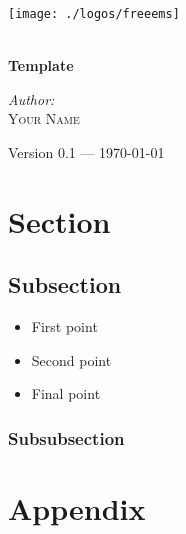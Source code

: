 \documentclass[12pt,a4paper,titlepage]{article}
\begin{document}
\begin{titlepage} 
\begin{center}

\texttt{[image: ./logos/freeems]}\\[1cm] \vfill

\HRule \\[0.8cm]
{ \huge \bfseries Template}\\[0.4cm]
\HRule \vfill

\Large \emph{Author:}\\
\textsc{Your Name} \vfill

{\large Version 0.1 --- \today}

\end{center}
\end{titlepage} 


\section{Section }

\subsection{Subsection }

\begin{itemize}
\item First point
\item Second point
\item Final point
\end{itemize}

\subsubsection{Subsubsection }

\appendix

\section{Appendix }
\end{document}
